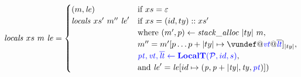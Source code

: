 \documentclass[acmsmall,review,anonymous]{acmart}\settopmatter{printfolios=true,printccs=false,printacmref=false}
\begin{document}
\[\mathit{locals} ~ xs ~ \mem ~ \lenv =
\begin{cases}
  (\mem, \lenv) & \textnormal{if } xs = \varepsilon \\
  \mathit{locals} ~ xs' ~ \mem'' ~ \lenv' & \textnormal{if } xs = (id,ty)::xs' \\
  & \textnormal{where } (\mem',p) \leftarrow \mathit{stack\_alloc} ~ |ty| ~ \mem, \\
  & \mem'' = \mem'[p \dots p+|ty| \mapsto \vundef@\vt@\overline{\lt}]_{|ty|}, \\
  & \trule{\localtres}{\localt}, \\
  & \textnormal{and } \lenv' = \lenv[id \mapsto (\mathit{p, p+|ty|,ty,\pt})]) \\
\end{cases}\]

\callstep
\returnstep
\end{document}
